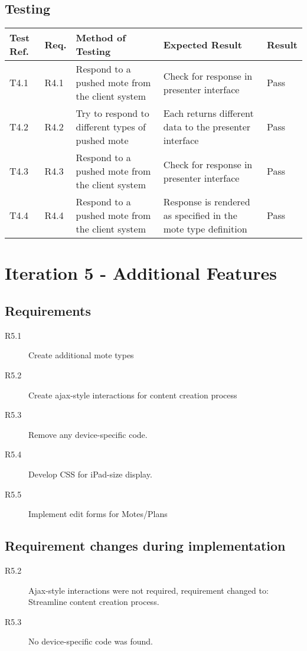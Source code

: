 \documentclass[a4papert,11pt,notitlepage]{article}
\begin{document}
\subsection{Testing}
\begin{tabular}{p{30pt} | p{25pt} | p{140pt} | p{140pt} || p{90pt}}
Test Ref. & Req. & Method of Testing & Expected Result & Result \\ \hline
T4.1 & R4.1 & Respond to a pushed mote from the client system & Check for response in presenter interface & Pass \\
T4.2 & R4.2 & Try to respond to different types of pushed mote & Each returns different data to the presenter interface & Pass \\
T4.3 & R4.3 & Respond to a pushed mote from the client system & Check for response in presenter interface & Pass \\
T4.4 & R4.4 & Respond to a pushed mote from the client system & Response is rendered as specified in the mote type definition & Pass \\
\end{tabular}

\section{Iteration 5 - Additional Features}
\subsection{Requirements}
\begin{description}
\item[R5.1] Create additional mote types
\item[R5.2] Create ajax-style interactions for content creation process
\item[R5.3] Remove any device-specific code.
\item[R5.4] Develop CSS for iPad-size display.
\item[R5.5] Implement edit forms for Motes/Plans
\end{description}

\subsection{Requirement changes during implementation}
\begin{description}
\item[R5.2] Ajax-style interactions were not required, requirement changed to: Streamline content creation process.
\item[R5.3] No device-specific code was found.
\end{description}
\end{document}
